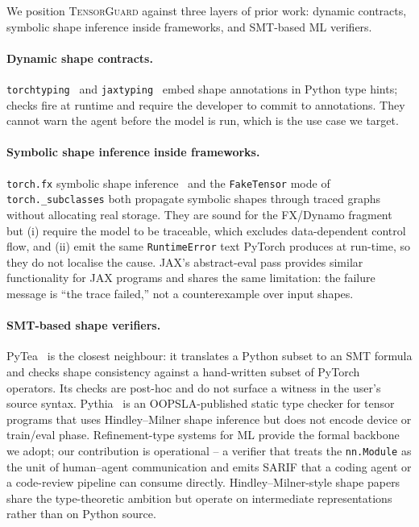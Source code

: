 \documentclass{article}
\theoremstyle{plain}
\theoremstyle{definition}
\newcommand{\TensorGuard}{\textsc{TensorGuard}}
\newcommand{\nnmodule}{\texttt{nn.Module}}
\newcommand{\code}[1]{\texttt{\small #1}}
\begin{document}
We position \TensorGuard{} against three layers of prior work:
dynamic contracts, symbolic shape inference inside frameworks, and
SMT-based ML verifiers.

\paragraph{Dynamic shape contracts.}
\code{torchtyping}~\citep{reed2022torchtyping} and
\code{jaxtyping}~\citep{kidger2022jaxtyping} embed shape
annotations in Python type hints; checks fire at runtime and
require the developer to commit to annotations.  They cannot warn
the agent before the model is run, which is the use case we
target.

\paragraph{Symbolic shape inference inside frameworks.}
\code{torch.fx} symbolic shape inference~\citep{reed2022fx} and the
\code{FakeTensor} mode of \code{torch.\_subclasses}
\citep{he2022faketensor} both propagate symbolic shapes through
traced graphs without allocating real storage.  They are sound for
the FX/Dynamo fragment but (i) require the model to be traceable,
which excludes data-dependent control flow, and (ii) emit the same
\code{RuntimeError} text PyTorch produces at run-time, so they
do not localise the cause.  JAX's abstract-eval pass
\citep{frostig2018jax} provides similar functionality for JAX
programs and shares the same limitation: the failure message is
``the trace failed,'' not a counterexample over input shapes.

\paragraph{SMT-based shape verifiers.}
PyTea~\citep{pytea2022} is the closest neighbour: it translates a
Python subset to an SMT formula and checks shape consistency
against a hand-written subset of PyTorch operators.  Its checks
are post-hoc and do not surface a witness in the user's source
syntax.  Pythia~\citep{tian2022pythia} is an OOPSLA-published
static type checker for tensor programs that uses Hindley--Milner
shape inference but does not encode device or train/eval phase.
Refinement-type systems for ML
\citep{rondon2008liquid,foster2007refinement,vazou2014liquid}
provide the formal backbone we adopt; our contribution is
operational -- a verifier that treats the \nnmodule{} as the unit
of human--agent communication and emits SARIF
\citep{oasis2020sarif} that a coding agent or a code-review
pipeline can consume directly.  Hindley--Milner-style shape papers
\citep{rink2018modeling,chen2017tvmtypes} share the type-theoretic
ambition but operate on intermediate representations rather than on
Python source.
\end{document}
